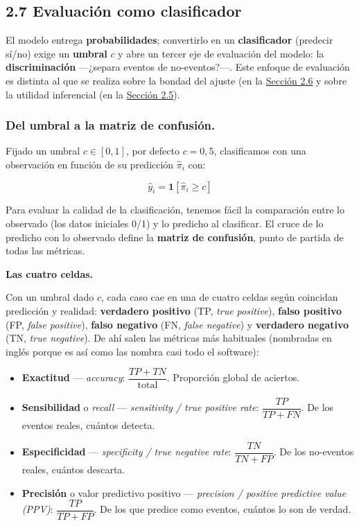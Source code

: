 \documentclass[
  letterpaper,
  DIV=11,
  numbers=noendperiod]{scrartcl}
\providecommand{\tightlist}{%
  \setlength{\itemsep}{0pt}\setlength{\parskip}{0pt}}\usepackage{longtable,booktabs,array}
\begin{document}
\hypertarget{sec-u12-evaluacion}{%
\subsection{2.7 Evaluación como clasificador}\label{sec-u12-evaluacion}}

El modelo entrega \textbf{probabilidades}; convertirlo en un
\textbf{clasificador} (predecir sí/no) exige un \textbf{umbral} \(c\) y
abre un tercer eje de evaluación del modelo: la \textbf{discriminación}
---¿separa eventos de no-eventos?---. Este enfoque de evaluación es
distinta al que se realiza sobre la bondad del ajuste (en la
\protect\hyperlink{sec-u12-diagnostico}{Sección 2.6} y sobre la utilidad
inferencial (en la \protect\hyperlink{sec-u12-inferencia}{Sección 2.5}).

\hypertarget{del-umbral-a-la-matriz-de-confusiuxf3n.}{%
\subsubsection{Del umbral a la matriz de
confusión.}\label{del-umbral-a-la-matriz-de-confusiuxf3n.}}

Fijado un umbral \(c \in [0,1]\), por defecto \(c=0{,}5\), clasificamos
con una observación en función de su predicción \(\hat\pi_i\) con:

\[\hat y_i=\mathbf{1}[\hat\pi_i\ge c]\]

Para evaluar la calidad de la clasificación, tenemos fácil la
comparación entre lo observado (los datos iniciales 0/1) y lo predicho
al clasificar. El cruce de lo predicho con lo observado define la
\textbf{matriz de confusión}, punto de partida de todas las métricas.

\textbf{Las cuatro celdas.}

Con un umbral dado \(c\), cada caso cae en una de cuatro celdas según
coincidan predicción y realidad: \textbf{verdadero positivo} (TP,
\emph{true positive}), \textbf{falso positivo} (FP, \emph{false
positive}), \textbf{falso negativo} (FN, \emph{false negative}) y
\textbf{verdadero negativo} (TN, \emph{true negative}). De ahí salen las
métricas más habituales (nombradas en inglés porque es así como las
nombra casi todo el software):

\begin{itemize}
\tightlist
\item
  \textbf{Exactitud} --- \emph{accuracy}:
  \(\dfrac{TP+TN}{\text{total}}\). Proporción global de aciertos.
\item
  \textbf{Sensibilidad} o \emph{recall} --- \emph{sensitivity / true
  positive rate}: \(\dfrac{TP}{TP+FN}\). De los eventos reales, cuántos
  detecta.
\item
  \textbf{Especificidad} --- \emph{specificity / true negative rate}:
  \(\dfrac{TN}{TN+FP}\). De los no-eventos reales, cuántos descarta.
\item
  \textbf{Precisión} o valor predictivo positivo --- \emph{precision /
  positive predictive value (PPV)}: \(\dfrac{TP}{TP+FP}\). De los que
  predice como eventos, cuántos lo son de verdad.
\end{itemize}
\end{document}
